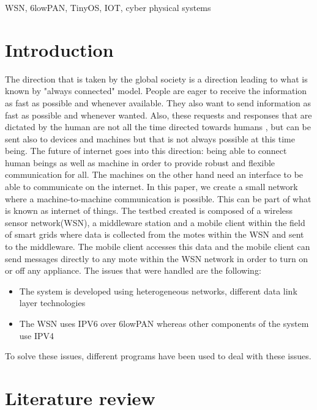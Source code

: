 \documentclass[conference]{IEEEtran}
\begin{document}
\begin{IEEEkeywords}
WSN, 6lowPAN, TinyOS, IOT, cyber physical systems
\end{IEEEkeywords}

\section{Introduction}
The direction that is taken by the global society is a direction leading to what is known by "always connected" model. People are eager to receive the information as fast as possible and whenever available. They also want to send information as fast as possible and whenever wanted. Also, these requests and responses that are dictated by the human are not all the time directed towards humans , but can be sent also to devices and machines but that is not always possible at this time being. The future  of internet goes into this direction: being able to connect human beings as well as machine in order to provide robust and flexible communication for all. The machines on the other hand need an interface to be able to communicate on the internet. In this paper, we create a small network where a machine-to-machine communication is possible. This can be part of what is known as internet of things. The testbed created is composed of a wireless sensor network(WSN), a middleware station and a mobile client within the field of smart grids where data is collected from the motes within the WSN and sent to the middleware. The mobile client accesses this data and the mobile client can send messages directly to any mote within the WSN network in order to turn on or off any appliance. The issues that were handled are the following:
\begin{itemize}
\item The system is developed using heterogeneous networks, different data link layer technologies
\item The WSN uses IPV6 over 6lowPAN whereas other components of the system use IPV4
\end{itemize}
To solve these issues, different programs have been used to deal with these issues. 
 
\section{Literature review}
\end{document}
